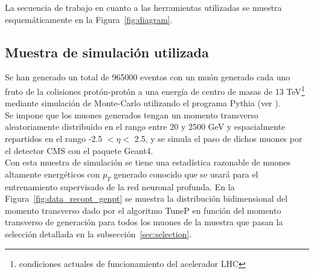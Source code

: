 La secuencia de trabajo en cuanto a las herramientas utilizadas se muestra esquem\'aticamente en la Figura~\ref{fig:diagram}.

\begin{center}
\label{fig:diagram}        
\end{center}


\subsection{Muestra de simulaci\'on utilizada}\label{sec:sample}

Se han generado un total de 965000 eventos con un mu\'on generado cada uno fruto de la colisiones prot\'on-prot\'on a una energ\'ia de centro de masas de 13 TeV\footnote{condiciones actuales de funcionamiento del acelerador LHC} mediante simulaci\'on de Monte-Carlo utilizando el programa Pythia (ver \cite{generator}). \\
Se impone que los muones generados tengan un momento transverso aleatoriamente distribuido en el rango entre 20 y 2500 GeV y espacialmente repartidos en el rango -2.5 $< \eta <$ 2.5, y se simula el paso de dichos muones por el detector CMS con el paquete Geant4. \\

Con esta muestra de simulaci\'on se tiene una estad\'istica razonable de muones altamente energ\'eticos con $p_{T}$ generado conocido que se usar\'a para el entrenamiento supervisado de la red neuronal profunda. En la Figura~\ref{fig:data_recopt_genpt} se muestra la distribuci\'on bidimensional del momento transverso dado por el algoritmo TuneP en funci\'on del momento transverso de generaci\'on para todos los muones de la muestra que pasan la selecci\'on detallada en la subsecci\'on~\ref{sec:selection}. \\

